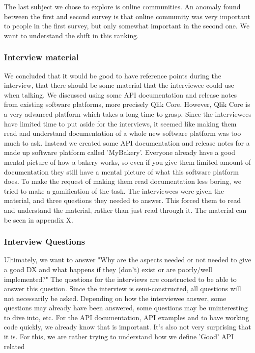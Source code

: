 \documentclass[11pt]{article}
\begin{document}
\begin{multicols}{2}
{    The last subject we chose to explore is online communities. An anomaly found
    between the first and second survey is that online community was very important
    to people in the first survey, but only somewhat important in the second one.
    We want to understand the shift in this ranking.

    \subsubsection{Interview material}
    We concluded that it would be good to have reference points during the interview,
    that there should be some material that the interviewee could use when talking.
    We discussed using some API documentation and release notes from existing software platforms,
    more precisely Qlik Core. However, Qlik Core is a very advanced platform which takes a long time
    to grasp. Since the interviewees have limited time to put aside for the interviews, it seemed
    like making them read and understand documentation of a whole new software platform was too much to ask.
    Instead we created some API documentation and release notes for a made up software platform
    called 'MyBakery'. Everyone already have a good mental picture of how a bakery works,
    so even if you give them limited amount of documentation they still have a mental picture
    of what this software platform does. To make the request of making them read documentation less boring,
    we tried to make a gamification of the task. The interviewees were given the material, and
    three questions they needed to answer. This forced them to read and understand the material, rather
    than just read through it. The material can be seen in appendix X.

    \subsubsection{Interview Questions}

    Ultimately, we want to answer "Why are the aspects needed or not needed
    to give a good DX and what happens if they (don’t) exist or are poorly/well implemented?"
    The questions for the interviews are constructed to be able to answer this question.
    Since the interview is semi-constructed, all questions will not necessarily be asked.
    Depending on how the interviewee answer, some questions may already have been answered,
    some questions may be uninteresting to dive into, etc.
    For the API documentation, API examples and to have working code quickly, we
    already know that is important. It's also not very surprising that it is.
    For this, we are rather trying to understand how we define 'Good' API related

}
\end{multicols}
\end{document}
